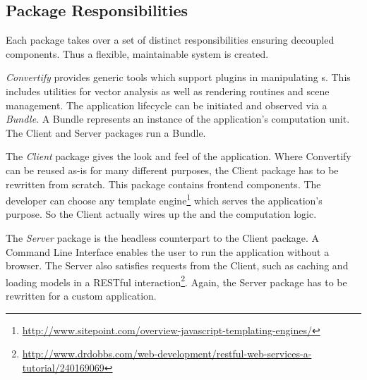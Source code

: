 \documentclass[../ClassicThesis.tex]{subfiles}
\begin{document}

\subsection{Package Responsibilities}

Each package takes over a set of distinct responsibilities ensuring decoupled components. Thus a flexible, maintainable system is created.

\emph{Convertify} provides generic tools which support plugins in manipulating {\threedmodel}s. This includes utilities for vector analysis as well as rendering routines and scene management. The application lifecycle can be initiated and observed via a \emph{Bundle}. A Bundle represents an instance of the application's computation unit. The Client and Server packages run a Bundle.

The \emph{Client} package gives the look and feel of the application. Where Convertify can be reused as-is for many different purposes, the Client package has to be rewritten from scratch. This package contains frontend components. The developer can choose any template engine\footnote{\url{http://www.sitepoint.com/overview-javascript-templating-engines/}} which serves the application's purpose. So the Client actually wires up the {\userinterface} and the computation logic.

The \emph{Server} package is the headless counterpart to the Client package. A Command Line Interface enables the user to run the application without a browser. The Server also satisfies requests from the Client, such as caching and loading models in a RESTful interaction\footnote{\url{http://www.drdobbs.com/web-development/restful-web-services-a-tutorial/240169069}}. Again, the Server package has to be rewritten for a custom application.
\end{document}
